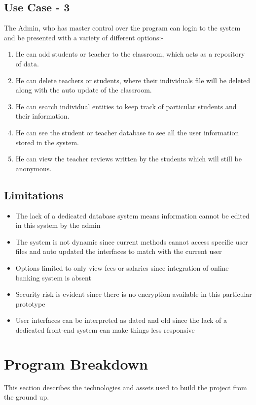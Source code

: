\documentclass[a4paper,12pt]{article}
\begin{document}
\subsection{Use Case - 3}
\enlargethispage{\baselineskip}
The Admin, who has master control over the program can login to the system and be presented with a variety of different options:-
\begin{enumerate}
    \item He can add students or teacher to the classroom, which acts as a repository of data.
    \item He can delete teachers or students, where their individuals file will be deleted along with the auto update of the classroom.
    \item He can search individual entities to keep track of particular students and their information.
    \item He can see the student or teacher database to see all the user information stored in the system.
    \item He can view the teacher reviews written by the students which will still be anonymous.
\end{enumerate}
\newpage
\subsection{Limitations}
\begin{itemize}
    \item The lack of a dedicated database system means information cannot be edited in this system by the admin
    \item The system is not dynamic since current methods cannot access specific user files and auto updated the interfaces to match with the current user
    \item Options limited to only view fees or salaries since integration of online banking system is absent
    \item Security risk is evident since there is no encryption available in this particular prototype
    \item User interfaces can be interpreted as dated and old since the lack of a dedicated front-end system can make things less responsive
\end{itemize}

\section {Program Breakdown}
\enlargethispage{\baselineskip}
This section describes the technologies and assets used to build the project from the ground up.
\end{document}
